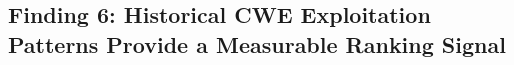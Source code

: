 \documentclass[conference,compsoc]{IEEEtran}
\begin{document}













\subsection{Finding 6: Historical CWE Exploitation Patterns Provide a Measurable Ranking Signal}
\label{sec:exploitability-ranking}
\end{document}
